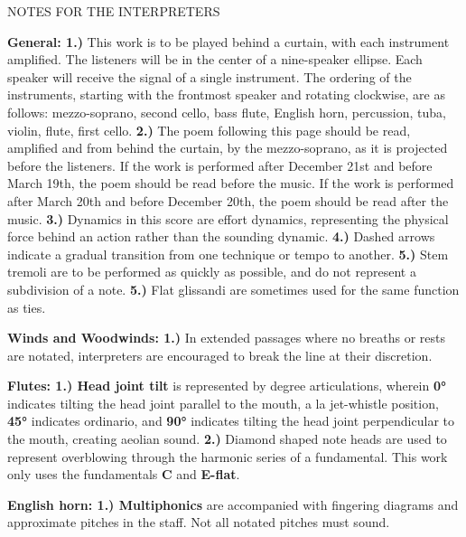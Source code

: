\documentclass[11pt]{article}
\begin{document}
\vspace*{4\baselineskip}

\begingroup
\begin{center}
\huge NOTES FOR THE INTERPRETERS
\end{center}
\endgroup

\begingroup
\textbf{General: 1.)} This work is to be played behind a curtain, with each instrument amplified. The listeners will be in the center of a nine-speaker ellipse. Each speaker will receive the signal of a single instrument. The ordering of the instruments, starting with the frontmost speaker and rotating clockwise, are as follows: mezzo-soprano, second cello, bass flute, English horn, percussion, tuba, violin, flute, first cello. \textbf{2.)} The poem following this page should be read, amplified and from behind the curtain, by the mezzo-soprano, as it is projected before the listeners. If the work is performed after December 21st and before March 19th, the poem should be read before the music. If the work is performed after March 20th and before December 20th, the poem should be read after the music. \textbf{3.)}  Dynamics in this score are effort dynamics, representing the physical force behind an action rather than the sounding dynamic. \textbf{4.)} Dashed arrows indicate a gradual transition from one technique or tempo to another. \textbf{5.)}  Stem tremoli are to be performed as quickly as possible, and do not represent a subdivision of a note. \textbf{5.)} Flat glissandi are sometimes used for the same function as ties.
\endgroup

\begingroup
\textbf{Winds and Woodwinds: 1.)} In extended passages where no breaths or rests are notated, interpreters are encouraged to break the line at their discretion.
\endgroup

\begingroup
\textbf{Flutes: 1.) Head joint tilt} is represented by degree articulations, wherein \textbf{0°} indicates tilting the head joint parallel to the mouth, a la jet-whistle position, \textbf{45°} indicates ordinario, and \textbf{90°} indicates tilting the head joint perpendicular to the mouth, creating aeolian sound. \textbf{2.)} Diamond shaped note heads are used to represent overblowing through the harmonic series of a fundamental. This work only uses the fundamentals \textbf{C} and \textbf{E-flat}.
\endgroup

\begingroup
\textbf{English horn: 1.) Multiphonics} are accompanied with fingering diagrams and approximate pitches in the staff. Not all notated pitches must sound.
\endgroup
\end{document}

